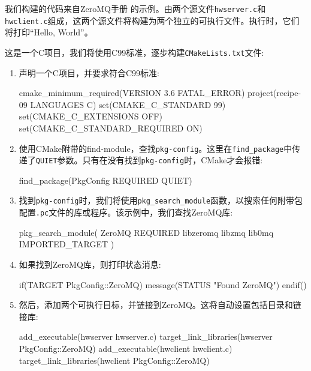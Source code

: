 
我们构建的代码来自ZeroMQ手册  的示例。由两个源文件\texttt{hwserver.c}和\texttt{hwclient.c}组成，这两个源文件将构建为两个独立的可执行文件。执行时，它们将打印“Hello, World”。


这是一个C项目，我们将使用C99标准，逐步构建\texttt{CMakeLists.txt}文件:

\begin{enumerate}
\item 声明一个C项目，并要求符合C99标准:

\begin{codebox}[cmake]
cmake_minimum_required(VERSION 3.6 FATAL_ERROR)
project(recipe-09 LANGUAGES C)
set(CMAKE_C_STANDARD 99)
set(CMAKE_C_EXTENSIONS OFF)
set(CMAKE_C_STANDARD_REQUIRED ON)
\end{codebox}

\item 使用CMake附带的find-module，查找\texttt{pkg-config}。这里在\texttt{find\_package}中传递了\texttt{QUIET}参数。只有在没有找到\texttt{pkg-config}时，CMake才会报错:

\begin{codebox}[cmake]
find_package(PkgConfig REQUIRED QUIET)
\end{codebox}

\item 找到\texttt{pkg-config}时，我们将使用\texttt{pkg\_search\_module}函数，以搜索任何附带包配置\texttt{.pc}文件的库或程序。该示例中，我们查找ZeroMQ库:

\begin{codebox}[cmake]
pkg_search_module(
  ZeroMQ
  REQUIRED
    libzeromq libzmq lib0mq
  IMPORTED_TARGET
  )
\end{codebox}

\item 如果找到ZeroMQ库，则打印状态消息:

\begin{codebox}[cmake]
if(TARGET PkgConfig::ZeroMQ)
    message(STATUS "Found ZeroMQ")
endif()
\end{codebox}

\item 然后，添加两个可执行目标，并链接到ZeroMQ。这将自动设置包括目录和链接库:

\begin{codebox}[cmake]
add_executable(hwserver hwserver.c)
target_link_libraries(hwserver PkgConfig::ZeroMQ)
add_executable(hwclient hwclient.c)
target_link_libraries(hwclient PkgConfig::ZeroMQ)
\end{codebox}


\end{enumerate}

